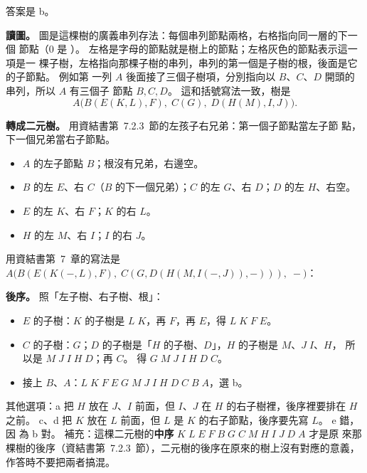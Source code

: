 \begin{pastsoln}
答案是 b。

\textbf{讀圖。} 圖是這棵樹的廣義串列存法：每個串列節點兩格，右格指向同一層的下一個
節點（$0$ 是 \NIL）。 左格是字母的節點就是樹上的節點；左格灰色的節點表示這一項是一
棵子樹，左格指向那棵子樹的串列，串列的第一個是子樹的根，後面是它的子節點。 例如第
一列 $A$ 後面接了三個子樹項，分別指向以 $B$、$C$、$D$ 開頭的串列，所以 $A$ 有三個子
節點 $B, C, D$。 這和括號寫法一致，樹是
\[
A\bigl(B(E(K, L), F),\; C(G),\; D(H(M), I, J)\bigr).
\]

\textbf{轉成二元樹。} 用資結書第~7.2.3~節的左孩子右兄弟：第一個子節點當左子節
點，下一個兄弟當右子節點。
\begin{itemize}
\item $A$ 的左子節點 $B$；根沒有兄弟，右邊空。
\item $B$ 的左 $E$、右 $C$（$B$ 的下一個兄弟）；$C$ 的左 $G$、右 $D$；$D$ 的左 $H$、右空。
\item $E$ 的左 $K$、右 $F$；$K$ 的右 $L$。
\item $H$ 的左 $M$、右 $I$；$I$ 的右 $J$。
\end{itemize}
用資結書第~7~章的寫法是
$A\bigl(B(E(K(-, L), F),\; C(G, D(H(M, I(-, J)), -))),\; -\bigr)$：

\begin{center}
\end{center}

\textbf{後序。} 照「左子樹、右子樹、根」：
\begin{itemize}
\item $E$ 的子樹：$K$ 的子樹是 $L\;K$，再 $F$，再 $E$，得 $L\;K\;F\;E$。
\item $C$ 的子樹：$G$；$D$ 的子樹是「$H$ 的子樹、$D$」，$H$ 的子樹是 $M$、$J\;I$、$H$，
所以是 $M\;J\;I\;H\;D$；再 $C$。 得 $G\;M\;J\;I\;H\;D\;C$。
\item 接上 $B$、$A$：$L\;K\;F\;E\;G\;M\;J\;I\;H\;D\;C\;B\;A$，選 b。
\end{itemize}

其他選項：a 把 $H$ 放在 $J$、$I$ 前面，但 $I$、$J$ 在 $H$ 的右子樹裡，後序裡要排在 $H$
之前。 c、d 把 $K$ 放在 $L$ 前面，但 $L$ 是 $K$ 的右子節點，後序要先寫 $L$。 e 錯，因
為 b 對。 補充：這棵二元樹的\textbf{中序} $K\;L\;E\;F\;B\;G\;C\;M\;H\;I\;J\;D\;A$ 才是原
來那棵樹的後序（資結書第~7.2.3~節），二元樹的後序在原來的樹上沒有對應的意義，
作答時不要把兩者搞混。
\end{pastsoln}
